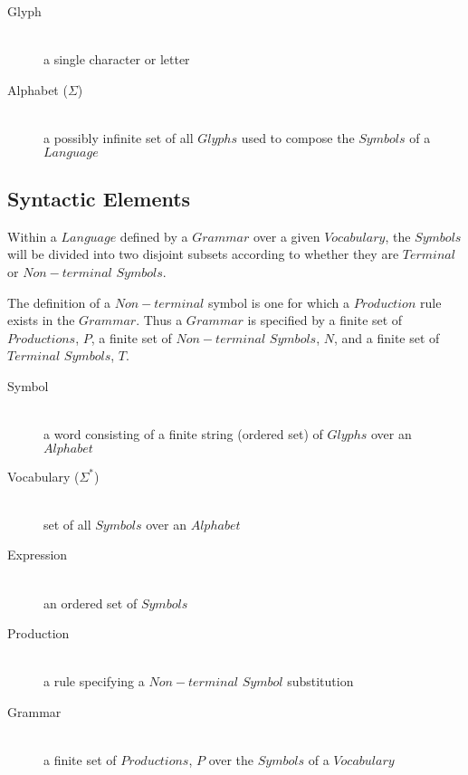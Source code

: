 \documentclass{article}
\begin{document}
    \begin{description}

    \item[Glyph] \hfill \\
    a single character or letter

    \item[Alphabet ($\Sigma$)] \hfill \\
    a possibly infinite set of all $Glyphs$ used to compose the
    $Symbols$ of a $Language$

    \end{description}

\subsection{Syntactic Elements}

Within a $Language$ defined by a $Grammar$ over a given $Vocabulary$,
the $Symbols$ will be divided into two disjoint subsets according to
whether they are $Terminal$ or $Non-terminal$ $Symbols$.

The definition of a $Non-terminal$ symbol is one for which a
$Production$ rule exists in the $Grammar$. Thus a $Grammar$ is
specified by a finite set of $Productions$, $P$, a finite set of
$Non-terminal$ $Symbols$, $N$, and a finite set of $Terminal$
$Symbols$, $T$.

    \begin{description}

    \item[Symbol] \hfill \\
    a word consisting of a finite string (ordered set) of $Glyphs$
    over an $Alphabet$

    \item[Vocabulary ($\Sigma^{*}$)] \hfill \\
    set of all $Symbols$ over an $Alphabet$

    \item[Expression] \hfill \\
    an ordered set of $Symbols$

    \item[Production] \hfill \\
    a rule specifying a $Non-terminal$ $Symbol$ substitution

    \item[Grammar] \hfill \\
    a finite set of $Productions$, $P$ over the $Symbols$ of a $Vocabulary$

    \end{description}
\end{document}
